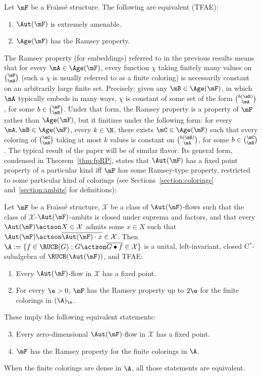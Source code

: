 \begin{theo}\label{thm:KPT}
Let $\mF$ be a Fra\"{\i}ss\'e structure. The following are equivalent (TFAE):
\begin{enumerate}
\item $\Aut(\mF)$ is extremely amenable.
\item $\Age(\mF)$ has the Ramsey property.
\end{enumerate}
\end{theo}

The Ramsey property (for embeddings) referred to in the previous results means that for every $\mA\in \Age(\mF)$, every function $\chi$ taking finitely many values on $\binom{\mF}{\mA}$ (such a $\chi$ is usually referred to as a finite coloring) is necessarily constant on an arbitrarily large finite set. Precisely: given any $\mB \in \Age(\mF)$, in which $\mA$ typically embeds in many ways, $\chi$ is constant of some set of the form $\binom{b(\mB)}{\mA}$, for some $b\in \binom{\mF}{\mB}$. Under that form, the Ramsey property is a property of $\mF$ rather than $\Age(\mF)$, but it finitizes under the following form: for every $\mA, \mB\in \Age(\mF)$, every $k\in \N$, there exists $\mC\in \Age(\mF)$ such that every coloring of $\binom{\mC}{\mA}$ taking at most $k$ values is constant on $\binom{b(\mB)}{\mA}$, for some $b\in \binom{\mC}{\mB}$. The typical result of the paper will be of similar flavor. Its general form, condensed in Theorem~\ref{thm:fpRP}, states that $\Aut(\mF)$ has a fixed point property of a particular kind iff $\mF$ has some Ramsey-type property, restricted to some particular kind of colorings (see Sections~\ref{section:colorings} and~\ref{section:ambits} for definitions):

\begin{theo}\label{thm:fpRP}
Let $\mF$ be a Fra\"{\i}ss\'e structure, $\mathcal X$ be a class of $\Aut(\mF)$-flows such that the class of $\mathcal X$-$\Aut(\mF)$-ambits is closed under suprema and factors, and that every $\Aut(\mF)\actson X\in \mathcal X$ admits some $x\in X$ such that $\Aut(\mF)\actson \overline{\Aut(\mF)\cdot x}\in \mathcal X$. Then $\A:=\{ f\in \RUCB(G) : G\actson \overline{G\bullet f} \in \mathcal X\}$ is a unital, left-invariant, closed C$^{*}$-subalgebra of $\RUCB(\Aut(\mF))$, and TFAE:
\begin{enumerate}
\item Every $\Aut(\mF)$-flow in $\mathcal X$ has a fixed point.
\item For every $\e>0$, $\mF$ has the Ramsey property up to $2\e$ for the finite colorings in $(\A)_{\e}$.
\end{enumerate}

These imply the following equivalent statements:
\begin{enumerate}
\setcounter{enumi}{2}
\item Every zero-dimensional $\Aut(\mF)$-flow in $\mathcal X$ has a fixed point.
\item $\mF$ has the Ramsey property for the finite colorings in $\A$.
\end{enumerate}

When the finite colorings are dense in $\A$, all those statements are equivalent.
\end{theo}

